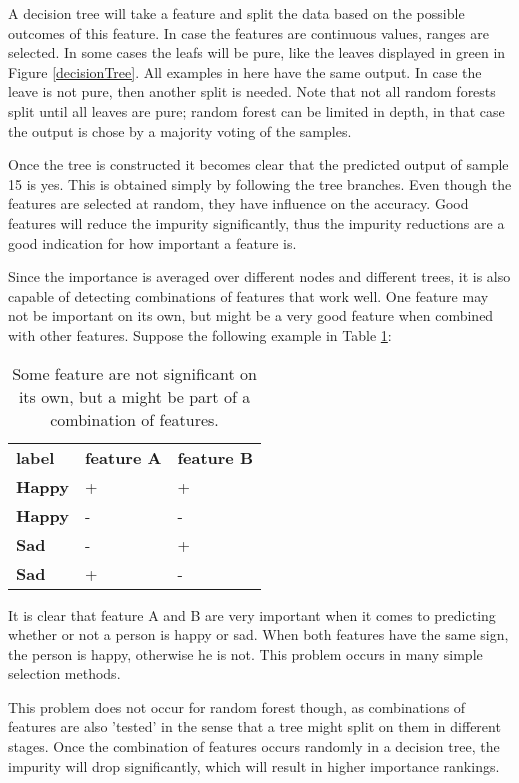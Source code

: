\npar
A decision tree will take a feature and split the data based on the possible outcomes of this feature. In case the features are continuous values, ranges are selected. In some cases the leafs will be pure, like the leaves displayed in  green in Figure \ref{decisionTree}. All examples in here have the same output. In case the leave is not pure, then another split is needed. Note that not all random forests split until all leaves are pure; random forest can be limited in depth, in that case the output is chose by a majority voting of the samples.


Once the tree is constructed it becomes clear that the predicted output of sample 15 is yes. This is obtained simply by following the tree branches. Even though the features are selected at random, they have influence on the accuracy. Good features will reduce the impurity significantly, thus the impurity reductions are a good indication for how important a feature is.

\npar

Since the importance is averaged over different nodes and different trees, it is also capable of detecting combinations of features that work well. One feature may not be important on its own, but might be a very good feature when combined with other features. Suppose the following example in Table \ref{featPair}:

\begin{table}[H]
\centering
\label{featPair}
\begin{tabular}{lll}
\textbf{label} & \textbf{feature A} & \textbf{feature B} \\
\textbf{Happy} & +                  & +                  \\
\textbf{Happy} & -                  & -                  \\
\textbf{Sad}   & -                  & +                  \\
\textbf{Sad}   & +                  & -                 
\end{tabular}
\caption{Some feature are not significant on its own, but a might be part of a combination of features.}
\end{table}

It is clear that feature A and B are very important when it comes to predicting whether or not a person is happy or sad. When both features have the same sign, the person is happy, otherwise he is not. This problem occurs in many simple selection methods. 

\npar

This problem does not occur for random forest though, as combinations of features are also 'tested' in the sense that a tree might split on them in different stages. Once the combination of features occurs randomly in a decision tree, the impurity will drop significantly, which will result in higher importance rankings.



